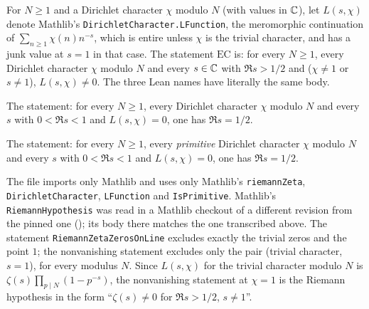 \begin{definition}\label{fin:every-character}
For $N\ge1$ and a Dirichlet character $\chi$ modulo $N$ (with values in $\mathbb{C}$),
let $L(s,\chi)$ denote Mathlib's \texttt{DirichletCharacter.LFunction}, the
meromorphic continuation of $\sum_{n\ge1}\chi(n)n^{-s}$, which is entire unless
$\chi$ is the trivial character, and has a junk value at $s=1$ in that case. The
statement $\mathrm{EC}$ is: for every $N\ge1$, every Dirichlet character $\chi$
modulo $N$ and every $s\in\mathbb{C}$ with $\Re s>1/2$ and ($\chi\ne1$ or $s\ne1$),
$L(s,\chi)\ne0$. The three Lean names have literally the same body.
\end{definition}

\begin{definition}\label{fin:strip-def}
The statement: for every $N\ge1$, every Dirichlet character $\chi$ modulo $N$
and every $s$ with $0<\Re s<1$ and $L(s,\chi)=0$, one has $\Re s=1/2$.
\end{definition}

\begin{definition}\label{fin:prim-def}
The statement: for every $N\ge1$, every \emph{primitive} Dirichlet character
$\chi$ modulo $N$ and every $s$ with $0<\Re s<1$ and $L(s,\chi)=0$, one has
$\Re s=1/2$.
\end{definition}

\begin{remark}[fidelity]\label{fin:rem-fidelity}
The file  imports only Mathlib and uses only Mathlib's
\texttt{riemannZeta}, \texttt{DirichletCharacter}, \texttt{LFunction} and
\texttt{IsPrimitive}. Mathlib's \texttt{RiemannHypothesis} was read in a Mathlib
checkout of a different revision from the pinned one
(); its body there matches
the one transcribed above. The statement \texttt{RiemannZetaZerosOnLine} excludes
exactly the trivial zeros and the point $1$; the nonvanishing statement
excludes only the pair (trivial character, $s=1$), for every modulus $N$. Since
$L(s,\chi)$ for the trivial character modulo $N$ is $\zeta(s)\prod_{p\mid N}(1-p^{-s})$,
the nonvanishing statement at $\chi=1$ is the Riemann hypothesis in the form
``$\zeta(s)\ne0$ for $\Re s>1/2$, $s\ne1$''.
\end{remark}

